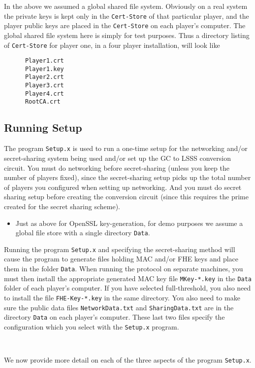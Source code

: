 In the above we assumed a global shared file system.  Obviously on
a real system the private keys is kept only in the
\verb+Cert-Store+ of that particular player, and the player public
keys are placed in the \verb+Cert-Store+ on each player's
computer. The global shared file system here is simply for test
purposes. Thus a directory listing of \verb+Cert-Store+
for player one, in a four player installation, will look like
\begin{verbatim}
      Player1.crt
      Player1.key
      Player2.crt
      Player3.crt
      Player4.crt
      RootCA.crt
\end{verbatim}


\subsection{Running Setup}
The program \verb+Setup.x+ is used to run a one-time setup 
for the networking and/or secret-sharing system being used
and/or set up the GC to LSSS conversion circuit.
You must do networking before secret-sharing (unless you keep
the number of players fixed), since the secret-sharing setup
picks up the total number of players you configured when setting
up networking.
And you must do secret sharing setup before creating the conversion
circuit (since this requires the prime created for the secret
sharing scheme).
\begin{itemize}
\item Just as above for OpenSSL key-generation, for demo purposes we assume
a global file store with a single directory \verb+Data+.
\end{itemize}
Running the program \verb+Setup.x+ and specifying the secret-sharing
method will cause the program to generate files holding MAC and/or FHE
keys and place them in the folder \verb+Data+.  When running the
protocol on separate machines, you must then install the appropriate
generated MAC key file \verb+MKey-*.key+ in the \verb+Data+ folder of
each player's computer.  If you have selected full-threshold, you also
need to install the file \verb+FHE-Key-*.key+ in the same directory.
You also need to make sure the public data files
\verb+NetworkData.txt+ and \verb+SharingData.txt+ are in the directory
\verb+Data+ on each player's computer.
These last two files specify the configuration which you select with
the \verb+Setup.x+ program.

~~

\noindent We now provide more detail on each of the three aspects of the program
\verb+Setup.x+.

